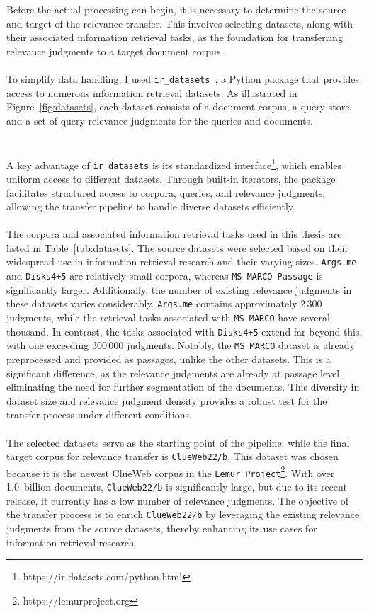 Before the actual processing can begin, it is necessary to determine the source and target of the relevance transfer. This involves selecting datasets, along with their associated information retrieval tasks, as the foundation for transferring relevance judgments to a target document corpus.
\\\\
To simplify data handling, I used \texttt{ir\_datasets}~\cite{macavaney:2021}, a Python package that provides access to numerous information retrieval datasets. As illustrated in Figure~\ref{fig:datasets}, each dataset consists of a document corpus, a query store, and a set of query relevance judgments for the queries and documents.
\\\\\\
A key advantage of \texttt{ir\_datasets} is its standardized interface\footnote{\scriptsize https://ir-datasets.com/python.html}, which enables uniform access to different datasets. Through built-in iterators, the package facilitates structured access to corpora, queries, and relevance judgments, allowing the transfer pipeline to handle diverse datasets efficiently.
\\\\
The corpora and associated information retrieval tasks used in this thesis are listed in Table~\ref{tab:datasets}. The source datasets were selected based on their widespread use in information retrieval research and their varying sizes. \texttt{Args.me} and \texttt{Disks4+5} are relatively small corpora, whereas \texttt{MS MARCO Passage} is significantly larger. Additionally, the number of existing relevance judgments in these datasets varies considerably. \texttt{Args.me} contains approximately $2\,300$ judgments, while the retrieval tasks associated with \texttt{MS MARCO} have several thousand. In contrast, the tasks associated with \texttt{Disks4+5} extend far beyond this, with one exceeding $300\,000$ judgments. Notably, the \texttt{MS MARCO} dataset is already preprocessed and provided as passages, unlike the other datasets. This is a significant difference, as the relevance judgments are already at passage level, eliminating the need for further segmentation of the documents. This diversity in dataset size and relevance judgment density provides a robust test for the transfer process under different conditions.
\\\\
The selected datasets serve as the starting point of the pipeline, while the final target corpus for relevance transfer is \texttt{ClueWeb22/b}. This dataset was chosen because it is the newest ClueWeb corpus in the \texttt{Lemur Project}\footnote{\scriptsize https://lemurproject.org}. With over 1.0~billion documents, \texttt{ClueWeb22/b} is significantly large, but due to its recent release, it currently has a low number of relevance judgments. The objective of the transfer process is to enrich \texttt{ClueWeb22/b} by leveraging the existing relevance judgments from the source datasets, thereby enhancing its use cases for information retrieval research.
\pagebreak


